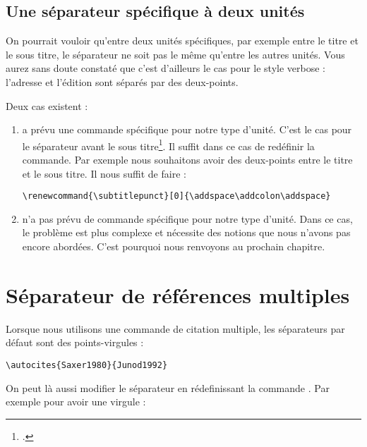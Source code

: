 	
\subsection{Une séparateur spécifique à deux unités}
	
	On pourrait vouloir qu'entre deux unités spécifiques, par exemple entre le titre et le sous titre, le séparateur ne soit pas le même qu'entre les autres unités.	Vous aurez sans doute constaté que c'est d'ailleurs le cas pour le style verbose : l'adresse et l'édition sont séparés par des deux-points.
	
	Deux cas existent :
		\begin{enumerate}
			\item {} a prévu une commande spécifique pour notre type d'unité. C'est le cas pour le séparateur avant le sous titre\footcite[Ces commandes sont peu nombreuse : on les trouvera dans]{biblatex_hooks}. Il suffit dans ce cas de redéfinir la commande. Par exemple nous souhaitons avoir des deux-points entre le titre et le sous titre. Il nous suffit de faire :
			\begin{verbatim}
\renewcommand{\subtitlepunct}[0]{\addspace\addcolon\addspace}
			\end{verbatim}
			
			\item {} n'a pas prévu de commande spécifique pour notre type d'unité. Dans ce cas, le problème est plus complexe et nécessite des notions que nous n'avons pas encore abordées. C'est pourquoi nous renvoyons au prochain chapitre.
		\end{enumerate}
		
\section{Séparateur de références multiples}\label{multicitedelim}

Lorsque nous utilisons une commande de citation multiple, les séparateurs par défaut sont des points-virgules :

\begin{verbatim}
\autocites{Saxer1980}{Junod1992}
\end{verbatim}

\begin{quotation}
\cites{Saxer1980}{Junod1992}
\end{quotation}

On peut là aussi modifier le séparateur en rédefinissant la commande . Par exemple pour avoir une virgule :

